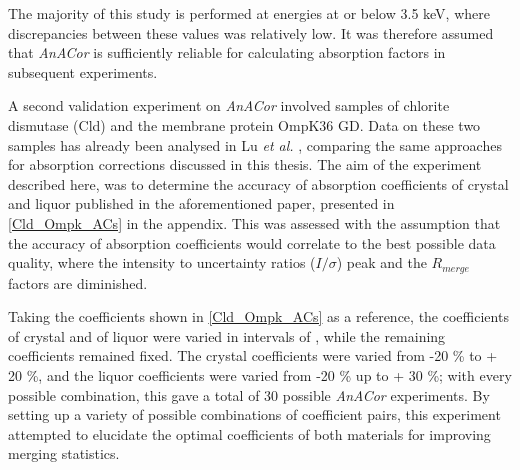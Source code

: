 
The majority of this study is performed at energies at or below 3.5 \unit{keV}, where discrepancies between these values was relatively low. It was therefore assumed that \textit{AnACor} is sufficiently reliable for calculating absorption factors in subsequent experiments.%

A second validation experiment on \textit{AnACor} involved samples of chlorite dismutase (Cld) and the membrane protein OmpK36 GD. Data on these two samples has already been analysed in Lu \textit{et al.} \cite{Lu2024}, comparing the same approaches for absorption corrections discussed in this thesis. %
The aim of the experiment described here, was to determine the accuracy of absorption coefficients of crystal and liquor published in the aforementioned paper, presented in \cref{Cld_Ompk_ACs} in the appendix. This was assessed with the assumption that the accuracy of absorption coefficients would correlate to the best possible data quality, where the intensity to uncertainty ratios ($I / \sigma$) peak and the $R_{merge}$ factors are diminished. %

Taking the coefficients shown in \cref{Cld_Ompk_ACs} as a reference, the coefficients of crystal and of liquor were varied in intervals of , while the remaining coefficients remained fixed. The crystal coefficients were varied from -20 \% to + 20 \%, and the liquor coefficients were varied from -20 \% up to + 30 \%; with every possible combination, this gave a total of 30 possible \textit{AnACor} experiments. By setting up a variety of possible combinations of coefficient pairs, this experiment attempted to elucidate the optimal coefficients of both materials for improving merging statistics.%

